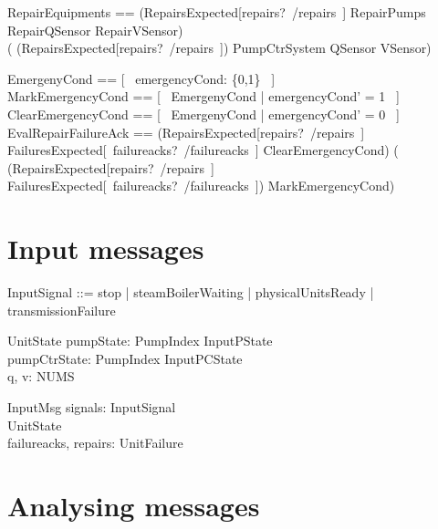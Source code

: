 \documentclass{report} %
\begin{document}
\begin{zed}
    RepairEquipments == (RepairsExpected[repairs?~/repairs~] \land RepairPumps \land RepairQSensor \land RepairVSensor) \lor \\
        ( (\lnot RepairsExpected[repairs?~/repairs~]) \land \Xi PumpCtrSystem \land \Xi QSensor \land \Xi VSensor)
\end{zed}

\begin{zed}
    EmergenyCond == [~ emergencyCond: \{0,1\} ~] \\ %
    MarkEmergencyCond == [~ \Delta EmergenyCond | emergencyCond' = 1 ~] \\
    ClearEmergencyCond == [~ \Delta EmergenyCond | emergencyCond' = 0 ~] \\
    EvalRepairFailureAck == 
        (RepairsExpected[repairs?~/repairs~] \land FailuresExpected[~failureacks?~/failureacks~] \land ClearEmergencyCond) \lor 
        ( (\lnot RepairsExpected[repairs?~/repairs~] \lor \lnot FailuresExpected[~failureacks?~/failureacks~]) \land MarkEmergencyCond)  \\
\end{zed}

\section{Input messages}

\begin{zed}
  InputSignal ::= stop | steamBoilerWaiting | physicalUnitsReady | transmissionFailure
\end{zed}

\begin{schema}{UnitState}
  pumpState: PumpIndex \fun InputPState \\ %
  pumpCtrState: PumpIndex \fun InputPCState \\ %
  q, v: NUMS
\end{schema}

\begin{schema}{InputMsg}
  signals: \power InputSignal \\ %
  UnitState \\ %
  failureacks, repairs: \power UnitFailure
\end{schema}

\section{Analysing messages}
\end{document}
